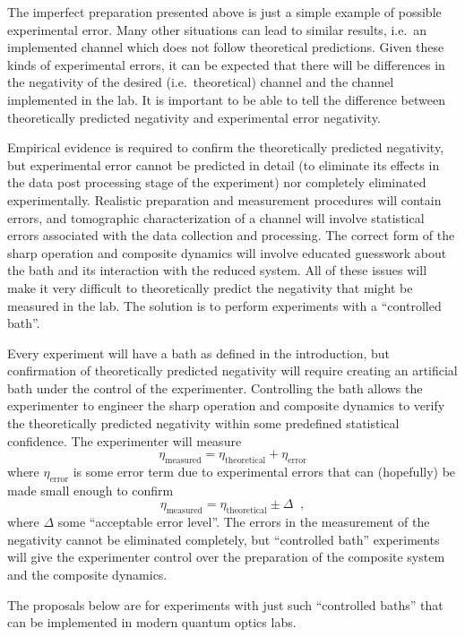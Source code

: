 The imperfect preparation presented above is just a simple example of possible experimental error.  Many other situations can lead to similar results, i.e.\ an implemented channel which does not follow theoretical predictions.  Given these kinds of experimental errors, it can be expected that there will be differences in the negativity of the desired (i.e.\ theoretical) channel and the channel implemented in the lab.  It is important to be able to tell the difference between theoretically predicted negativity and experimental error negativity.  

Empirical evidence is required to confirm the theoretically predicted negativity, but experimental error cannot be predicted in detail (to eliminate its effects in the data post processing stage of the experiment) nor completely eliminated experimentally.  Realistic preparation and measurement procedures will contain errors, and tomographic characterization of a channel will involve statistical errors associated with the data collection and processing.  The correct form of the sharp operation and composite dynamics will involve educated guesswork about the bath and its interaction with the reduced system.  All of these issues will make it very difficult to theoretically predict the negativity that might be measured in the lab.  The solution is to perform experiments with a ``controlled bath''.

Every experiment will have a bath as defined in the introduction, but confirmation of theoretically predicted negativity will require creating an artificial bath under the control of the experimenter.  Controlling the bath allows the experimenter to engineer the sharp operation and composite dynamics to verify the theoretically predicted negativity within some predefined statistical confidence.  The experimenter will measure
$$
\eta_{\mathrm{measured}} = \eta_{\mathrm{theoretical}} + \eta_{\mathrm{error}}
$$
where $\eta_{\mathrm{error}}$ is some error term due to experimental errors that can (hopefully) be made small enough to confirm
$$
\eta_{\mathrm{measured}} = \eta_{\mathrm{theoretical}} \pm \Delta\;\;,
$$
where $\Delta$ some ``acceptable error level''.  The errors in the measurement of the negativity cannot be eliminated completely, but ``controlled bath'' experiments will give the experimenter control over the preparation of the composite system and the composite dynamics.  

The proposals below are for experiments with just such ``controlled baths'' that can be implemented in modern quantum optics labs.  

